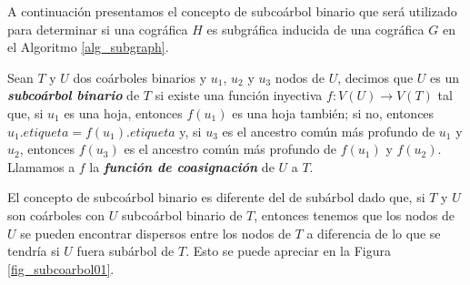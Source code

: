 A continuación presentamos el concepto de subcoárbol binario
que será utilizado para determinar si una cográfica $H$ es subgráfica
inducida de una cográfica $G$ en el Algoritmo \ref{alg_subgraph}.

Sean $T$ y $U$ dos coárboles binarios y $u_1$, $u_2$ y $u_3$ nodos de $U$, decimos
que $U$ es un \emph{\textbf{subcoárbol binario}} de $T$ si existe una función
inyectiva $f:V(U)\rightarrow V(T)$ tal que, si $u_1$ es una hoja, entonces $f(u_1)$
es una hoja también; si no, entonces $u_1.etiqueta = f(u_1).etiqueta$ y, si $u_3$ es
el ancestro común más profundo de $u_1$ y $u_2$, entonces $f(u_3)$ es el ancestro
común más profundo de $f(u_1)$ y $f(u_2)$. Llamamos a $f$ la \textbf{\emph{función de
coasignación}} de $U$ a $T$. 

El concepto de subcoárbol binario es diferente del de subárbol dado que, si $T$ y $U$
son coárboles con $U$ subcoárbol binario de $T$, entonces tenemos que los nodos de
$U$ se pueden encontrar dispersos entre los nodos de $T$ a diferencia de lo que se
tendría si $U$ fuera subárbol de $T$. Esto se puede apreciar en la Figura
\ref{fig_subcoarbol01}.

